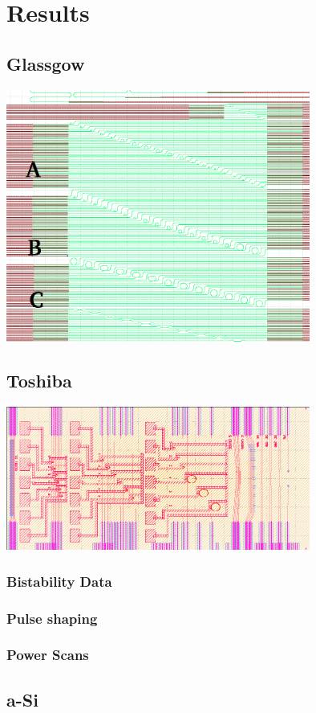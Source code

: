 \newpage
\section{Results}
%   
\subsection{Glassgow}
\begingroup
    \centering  
    \includegraphics[width=10cm]{img/results/glassgowChipNumbering.png}
     \vspace{3pt} \label{crossCompare}
\endgroup
\subsection{Toshiba}
\begingroup
    \centering  
    \includegraphics[width=10cm]{img/results/toshiba.png}
     \vspace{3pt} \label{crossCompare}
\endgroup
\subsubsection{Bistability Data}
\subsubsection{Pulse shaping}
\subsubsection{Power Scans}
%
\subsection{a-Si}

